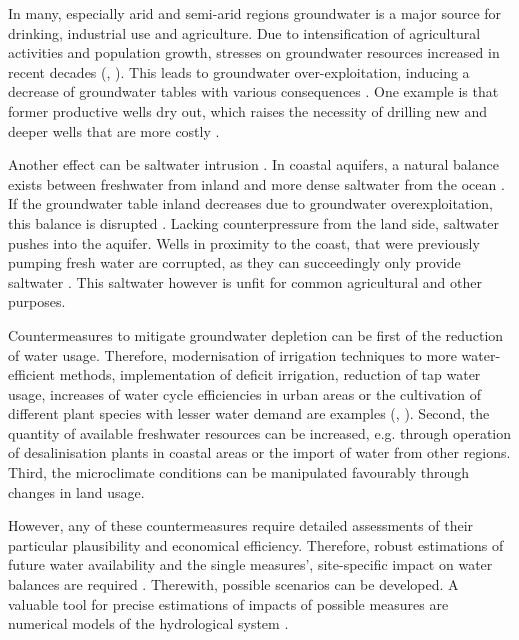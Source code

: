 In many, especially arid and semi-arid regions groundwater is a major source for drinking, industrial use and agriculture. 
Due to intensification of agricultural activities and population growth, stresses on groundwater resources increased in recent decades (\textcite{Choukr.2017}, \textcite{ElRawy.2022}). 
This leads to groundwater over-exploitation, inducing a decrease of groundwater tables with various consequences \parencite{Hssaisoune.2017}. 
One example is that former productive wells dry out, which raises the necessity of drilling new and deeper wells that are more costly \parencite{English.1990}. 

Another effect can be saltwater intrusion \parencite{Fetter.2001}. 
In coastal aquifers, a natural balance exists between freshwater from inland and more dense saltwater from the ocean \parencite{Mays.2005}. 
If the groundwater table inland decreases due to groundwater overexploitation, this balance is disrupted \parencite{Fetter.2001}. 
Lacking counterpressure from the land side, saltwater pushes into the aquifer. 
Wells in proximity to the coast, that were previously pumping fresh water are corrupted, as they can succeedingly only provide saltwater \parencite{Fetter.2001}. 
This saltwater however is unfit for common agricultural \parencite{Taiz.2015} and other purposes.

Countermeasures to mitigate groundwater depletion can be first of the reduction of water usage. 
Therefore, modernisation of irrigation techniques to more water-efficient methods, implementation of deficit irrigation, reduction of tap water usage, increases of water cycle efficiencies in urban areas or the cultivation of different plant species with lesser water demand are examples (\textcite{English.1990}, \textcite{Schuetze.2012}). 
Second, the quantity of available freshwater resources can be increased, e.g. through operation of desalinisation plants in coastal areas or the import of water from other regions. 
Third, the microclimate conditions can be manipulated favourably through changes in land usage.

However, any of these countermeasures require detailed assessments of their particular plausibility and economical efficiency. 
Therefore, robust estimations of future water availability and the single measures', site-specific impact on water balances are required \parencite{ElRawy.2022}. 
Therewith, possible scenarios can be developed. A valuable tool for precise estimations of impacts of possible measures are numerical models of the hydrological system \parencite{ElRawy.2022}.

